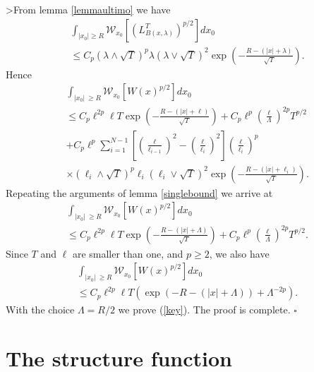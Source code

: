 \documentclass[a4paper,12pt]{article}
\begin{document}
>From lemma \ref{lemmaultimo} we have
\begin{align*}
&  \int_{\left|  x_{0}\right|  \geq R}\mathcal{W}_{x_{0}}\left[  \left(
L_{B(x,\lambda)}^{T}\right)  ^{p/2}\right]  dx_{0}\\
&  \leq C_{p}(\lambda\wedge\sqrt{T})^{p}\lambda(\lambda\vee\sqrt{T})^{2}%
\exp\left(  -\frac{R-\left(  \left|  x\right|  +\lambda\right)  }{\sqrt{T}%
}\right)  .
\end{align*}
Hence
\begin{align*}
&  \int_{\left|  x_{0}\right|  \ \geq R}\mathcal{W}_{x_{0}}\left[
W(x)^{p/2}\right]  dx_{0}\\
&  \leq C_{p}\ell^{2p}\ell T\exp\left(  -\frac{R-\left(  \left|  x\right|
+\ell\right)  }{\sqrt{T}}\right)  +C_{p}\ell^{p}\left(  \frac{\ell}{\Lambda
}\right)  ^{2p}T^{p/2}\\
&  +C_{p}\ell^{p}\sum_{i=1}^{N-1}\left[  \left(  \frac{\ell}{\ell_{i-1}%
}\right)  ^{2}-\left(  \frac{\ell}{\ell_{i}}\right)  ^{2}\right]  \left(
\frac{\ell}{\ell_{i}}\right)  ^{p}\\
&  \times(\ell_{i}\wedge\sqrt{T})^{p}\ell_{i}(\ell_{i}\vee\sqrt{T})^{2}%
\exp\left(  -\frac{R-\left(  \left|  x\right|  +\ell_{i}\right)  }{\sqrt{T}%
}\right)  .
\end{align*}
Repeating the arguments of lemma \ref{singlebound} we arrive at
\begin{align*}
&  \int_{\left|  x_{0}\right|  \ \geq R}\mathcal{W}_{x_{0}}\left[
W(x)^{p/2}\right]  dx_{0}\\
&  \leq C_{p}\ell^{2p}\ell T\exp\left(  -\frac{R-\left(  \left|  x\right|
+\Lambda\right)  }{\sqrt{T}}\right)  +C_{p}\ell^{p}\left(  \frac{\ell}%
{\Lambda}\right)  ^{2p}T^{p/2}.
\end{align*}
Since $T$ and $\ell$ are smaller than one, and $p\geq2$, we also have
\begin{align*}
&  \int_{\left|  x_{0}\right|  \ \geq R}\mathcal{W}_{x_{0}}\left[
W(x)^{p/2}\right]  dx_{0}\\
&  \leq C_{p}\ell^{2p}\ell T\left(  \exp\left(  -R-\left(  \left|  x\right|
+\Lambda\right)  \right)  +\Lambda^{-2p}\right)  .
\end{align*}
With the choice $\Lambda=R/2$ we prove (\ref{key}). The proof is complete.
\hfill$\square$

\section{The structure function}
\end{document}
